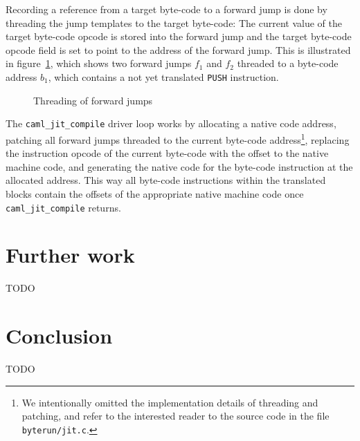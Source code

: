 \documentclass[10pt,a4paper,twocolumn]{article}
\begin{document}
Recording a reference from a target byte-code to a forward jump is done by threading the
jump templates to the target byte-code: The current value of the target byte-code opcode
is stored into the forward jump and the target byte-code opcode field is set to point
to the address of the forward jump. This is illustrated in figure~\ref{figure:Threading_of_forward_jumps},
which shows two forward jumps $f_1$ and $f_2$ threaded to a byte-code address $b_1$,
which contains a not yet translated \texttt{PUSH} instruction.

\begin{figure}[htb]
  \centering
  \caption{Threading of forward jumps}
  \label{figure:Threading_of_forward_jumps}
\end{figure}

The \texttt{caml\_jit\_compile} driver loop works by allocating a native code address,
patching all forward jumps threaded to the current byte-code address\footnote{We intentionally
omitted the implementation details of threading and patching, and refer to the interested
reader to the source code in the file \texttt{byterun/jit.c}.}, replacing the
instruction opcode of the current byte-code with the offset to the native machine code,
and generating the native code for the byte-code instruction at the allocated address.
This way all byte-code instructions within the translated blocks contain the offsets
of the appropriate native machine code once \texttt{caml\_jit\_compile} returns.


\section{Further work}

TODO


\section{Conclusion}

TODO




\end{document}
